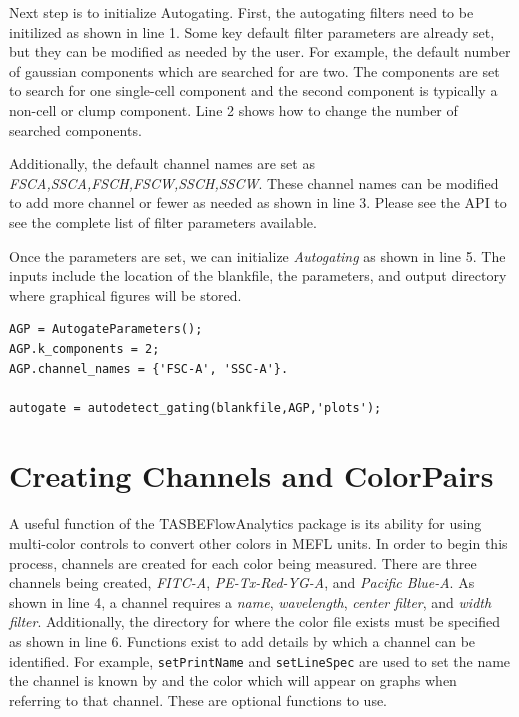 Next step is to initialize Autogating. First, the autogating filters need to be initilized as shown in line 1. Some key default filter parameters are already set, but they can be modified as needed by the user. For example, the default number of gaussian components which are searched for are two. The components are set to search for one single-cell component and the second component is typically a non-cell or clump component. Line 2 shows how to change the number of searched components.

Additionally, the default channel names are set as \textit{FSC\-A,SSC\-A,FSC\-H,FSC\-W,SSC\-H,SSC\-W}. These channel names can be modified to add more channel or fewer as needed as shown in line 3. Please see the API to see the complete list of filter parameters available.

Once the parameters are set, we can initialize \textit{Autogating} as shown in line 5. The inputs include the location of the blankfile, the parameters, and output directory where graphical figures will be stored.

\begin{minipage}{0.95\textwidth} 
\begin{lstlisting}
AGP = AutogateParameters();
AGP.k_components = 2; 
AGP.channel_names = {'FSC-A', 'SSC-A'}. 

autogate = autodetect_gating(blankfile,AGP,'plots');
\end{lstlisting}
\end{minipage}

\section*{Creating Channels and ColorPairs}

A useful function of the TASBEFlowAnalytics package is its ability for using multi-color controls to convert other colors in MEFL units. In order to begin this process, channels are created for each color being measured. There are three channels being created, \textit{FITC-A}, \textit{PE-Tx-Red-YG-A}, and \textit{Pacific Blue-A}. As shown in line 4, a channel requires a \textit{name}, \textit{wavelength}, \textit{center filter}, and \textit{width filter}.
Additionally, the directory for where the color file exists must be specified as shown in line 6. Functions exist to add details by which a channel can be identified. For example, \lstinline+setPrintName+ and \lstinline+setLineSpec+ are used to set the name the channel is known by and the color which will appear on graphs when referring to that channel. These are optional functions to use.

